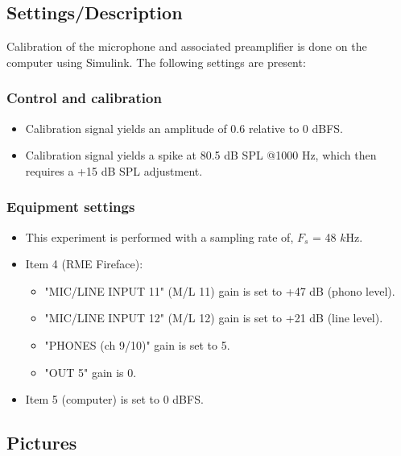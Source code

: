 \subsection{Settings/Description}
\label{SettingsCacellationPath}

Calibration of the microphone and associated preamplifier is done on the computer using Simulink\textsuperscript{\textregistered}. The following settings are present:

\subsubsection{Control and calibration}
\begin{itemize}
	\item Calibration signal yields an amplitude of 0.6 relative to 0 dBFS.
	\item Calibration signal yields a spike at 80.5 dB SPL @1000 Hz, which then requires a +15 dB SPL adjustment.
\end{itemize}

\subsubsection{Equipment settings}
\begin{itemize}
	\item This experiment is performed with a sampling rate of, $F_{s}$ = 48 $k$Hz.
	\item Item 4 (RME Fireface):
		\begin{itemize}
			\item "MIC/LINE INPUT 11" (M/L 11) gain is set to +47 dB (phono level).
			\item "MIC/LINE INPUT 12" (M/L 12) gain is set to +21 dB (line level).
			\item "PHONES (ch 9/10)" gain is set to 5.
			\item "OUT 5" gain is 0.
		\end{itemize}		
	\item Item 5 (computer) is set to 0 dBFS.
\end{itemize}


\subsection{Pictures}

